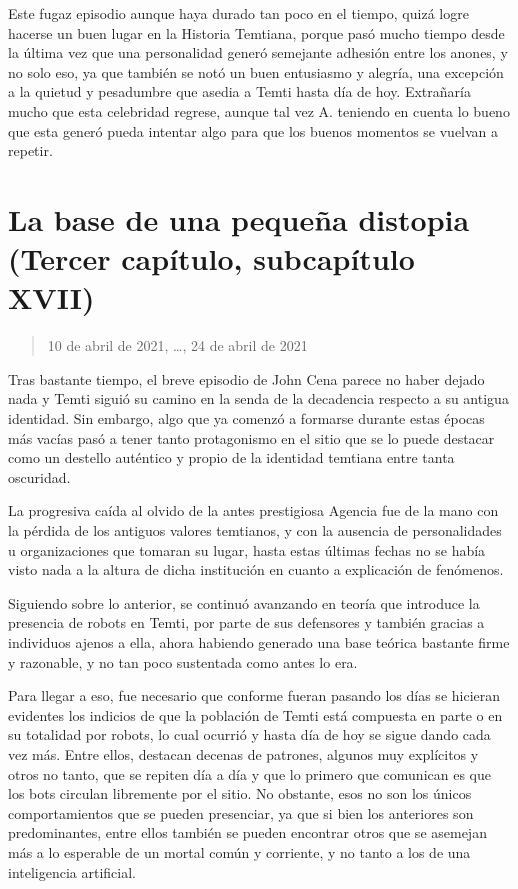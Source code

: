 \documentclass[
  spanish,
]{book}
\begin{document}
Este fugaz episodio aunque haya durado tan poco en el tiempo, quizá logre hacerse un buen lugar en la Historia Temtiana, porque pasó mucho tiempo desde la última vez que una personalidad generó semejante adhesión entre los anones, y no solo eso, ya que también se notó un buen entusiasmo y alegría, una excepción a la quietud y pesadumbre que asedia a Temti hasta día de hoy. Extrañaría mucho que esta celebridad regrese, aunque tal vez A. teniendo en cuenta lo bueno que esta generó pueda intentar algo para que los buenos momentos se vuelvan a repetir.

\hypertarget{la-base-de-una-pequeuxf1a-distopia-tercer-capuxedtulo-subcapuxedtulo-xvii}{%
\section{La base de una pequeña distopia (Tercer capítulo, subcapítulo XVII)}\label{la-base-de-una-pequeuxf1a-distopia-tercer-capuxedtulo-subcapuxedtulo-xvii}}

\begin{quote}
10 de abril de 2021, \ldots, 24 de abril de 2021
\end{quote}

Tras bastante tiempo, el breve episodio de John Cena parece no haber dejado nada y Temti siguió su camino en la senda de la decadencia respecto a su antigua identidad. Sin embargo, algo que ya comenzó a formarse durante estas épocas más vacías pasó a tener tanto protagonismo en el sitio que se lo puede destacar como un destello auténtico y propio de la identidad temtiana entre tanta oscuridad.

La progresiva caída al olvido de la antes prestigiosa Agencia fue de la mano con la pérdida de los antiguos valores temtianos, y con la ausencia de personalidades u organizaciones que tomaran su lugar, hasta estas últimas fechas no se había visto nada a la altura de dicha institución en cuanto a explicación de fenómenos.

Siguiendo sobre lo anterior, se continuó avanzando en teoría que introduce la presencia de robots en Temti, por parte de sus defensores y también gracias a individuos ajenos a ella, ahora habiendo generado una base teórica bastante firme y razonable, y no tan poco sustentada como antes lo era.

Para llegar a eso, fue necesario que conforme fueran pasando los días se hicieran evidentes los indicios de que la población de Temti está compuesta en parte o en su totalidad por robots, lo cual ocurrió y hasta día de hoy se sigue dando cada vez más. Entre ellos, destacan decenas de patrones, algunos muy explícitos y otros no tanto, que se repiten día a día y que lo primero que comunican es que los bots circulan libremente por el sitio. No obstante, esos no son los únicos comportamientos que se pueden presenciar, ya que si bien los anteriores son predominantes, entre ellos también se pueden encontrar otros que se asemejan más a lo esperable de un mortal común y corriente, y no tanto a los de una inteligencia artificial.
\end{document}
